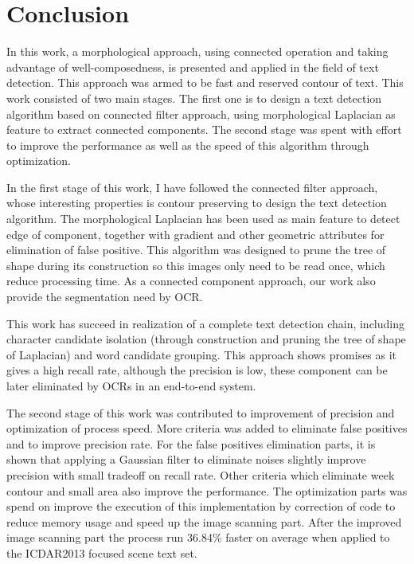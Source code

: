 
\graphicspath{ {7chapterConclusion/image/} }
\chapter{Conclusion}


In this work, a morphological approach, using connected operation and taking advantage of well-composedness, is presented and applied in the field of text detection. This approach was armed to be fast and reserved contour of text. This work consisted of two main stages. The first one is to design a text detection algorithm based on connected filter approach, using morphological Laplacian as feature to extract connected components. The second stage was spent with effort to improve the performance as well as the speed of this algorithm through optimization. 


In the first stage of this work, I have followed the connected filter approach, whose interesting properties is contour preserving to design the text detection algorithm. The morphological Laplacian has been used as main feature to detect edge of component, together with gradient and other geometric attributes for elimination of false positive. This algorithm was designed to prune the tree of shape during its construction so this images only need to be read once, which reduce processing time. As a connected component approach, our work also provide the segmentation need by OCR. 


This work has succeed in realization of a complete text detection chain, including character candidate isolation (through construction and pruning the tree of shape of Laplacian) and word candidate grouping. This approach shows promises as it gives a high recall rate, although the precision is low, these component can be later eliminated by OCRs in an end-to-end system.
  

The second stage of this work was contributed to improvement of precision and optimization of process speed. More criteria was added to eliminate false positives and to improve precision rate. For the false positives elimination parts, it is shown that applying a Gaussian filter to eliminate noises slightly improve precision with small tradeoff on recall rate. Other criteria which eliminate week contour and small area also improve the performance. The optimization parts was spend on improve the execution of this implementation by correction of code to reduce memory usage and speed up the image scanning part. After the improved image scanning part the process run 36.84\% faster on average when applied to the ICDAR2013 focused scene text set. 

